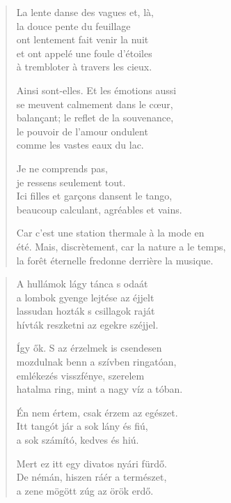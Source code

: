 \documentclass[11pt]{extbook}
\newcommand*{\centeredornament}{\centerline{\pgfornament[width=6cm]{88}}}
\begin{document}
\begin{verse}
  La lente danse des vagues et, là, \\
  la douce pente du feuillage \\
  ont lentement fait venir la nuit \\
  et ont appelé une foule d'étoiles \\
  à trembloter à travers les cieux.

  Ainsi sont-elles. Et les émotions aussi \\
  se meuvent calmement dans le cœur, \\
  balançant; le reflet de la souvenance, \\
  le pouvoir de l'amour ondulent \\
  comme les vastes eaux du lac.

  Je ne comprends pas, \\
  je ressens seulement tout. \\
  Ici filles et garçons dansent le tango, \\
  beaucoup calculant, agréables et vains.

  Car c'est une station thermale à la mode en \\
  été. Mais, discrètement, car la nature a le temps,\hspace*{-1mm} \\
  la forêt éternelle fredonne derrière la musique.
\end{verse}

\newpage

\vspace*{-15mm}
\centeredornament



\begin{verse}
  A hullámok lágy tánca s odaát \\
  a lombok gyenge lejtése az éjjelt \\
  lassudan hozták s csillagok raját \\
  hívták reszketni az egekre széjjel.

  Így ők. S az érzelmek is csendesen \\
  mozdulnak benn a szívben ringatóan, \\
  emlékezés visszfénye, szerelem \\
  hatalma ring, mint a nagy víz a tóban.

  Én nem értem, csak érzem az egészet. \\
  Itt tangót jár a sok lány és fiú, \\
  a sok számító, kedves és hiú.

  Mert ez itt egy divatos nyári fürdő. \\
  De némán, hiszen ráér a természet, \\
  a zene mögött zúg az örök erdő.
\end{verse}
\end{document}
